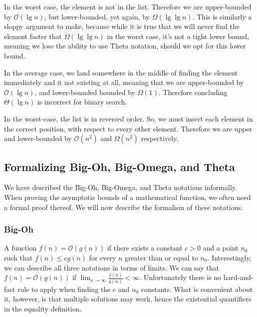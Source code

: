 In the worst case, the element is not in the list. Therefore we are upper-bounded by $\mathcal{O}(\lg{n})$, but lower-bounded, yet again, by $\Omega(\lg\lg{n})$. This is similarly a sloppy argument to make, because while it is true that we will never find the element faster that $\Omega(\lg\lg{n})$ in the worst case, it's not a tight lower bound, meaning we lose the ability to use Theta notation, should we opt for this lower bound.

In the average case, we land somewhere in the middle of finding the element immediately and it not existing at all, meaning that we are upper-bounded by $\mathcal{O}(\lg{n})$, and lower-bounded bounded by $\Omega(1)$. Therefore concluding $\Theta(\lg{n})$ is incorrect for binary search.


In the worst-case, the list is in reversed order. So, we must insert each element in the correct position, with respect to every other element. Therefore we are upper and lower-bounded by $\mathcal{O}(n^2)$ and $\Omega(n^2)$ respectively.

\subsection{Formalizing Big-Oh, Big-Omega, and Theta}
We have described the Big-Oh, Big-Omega, and Theta notations informally. When proving the asymptotic bounds of a mathematical function, we often need a formal proof thereof. We will now describe the formalism of these notations.

\subsubsection*{Big-Oh}
A function $f(n) = \mathcal{O}(g(n))$ if there exists a constant $c > 0$ and a point $n_0$ such that $f(n) \leq cg(n)$ for every $n$ greater than or equal to $n_0$. Interestingly, we can describe all three notations in terms of limits. We can say that $f(n) = \mathcal{O}(g(n))$ if $\lim_{n \to \infty} \frac{f(n)}{g(n)} < \infty$. Unfortunately there is no hard-and-fast rule to apply when finding the $c$ and $n_0$ constants. What is convenient about it, however, is that multiple solutions may work, hence the existential quantifiers in the equality definition.

